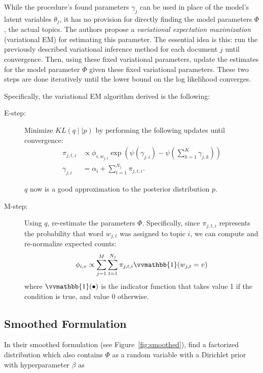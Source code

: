 \documentclass[11pt]{article}
\newcommand{\indicator}{\vvmathbb{1}}
\begin{document}
While the procedure's found parameters $\gamma_j$ can be used in place of
the model's latent variables $\theta_j$, it has no provision for directly
finding the model parameters $\Phi$, the actual topics. The authors propose
a \emph{variational expectation maximization} (variational EM) for
estimating this parameter. The essential idea is this: run the previously
described variational inference method for each document $j$ until
convergence. Then, using these fixed variational parameters, update the
estimates for the model parameter $\Phi$ given these fixed variational
parameters. These two steps are done iteratively until the lower bound on
the log likelihood converges.

Specifically, the variational EM algorithm derived is the following:
\begin{description}
  \item[E-step:]
    Minimize $KL(q \mid\mid p)$ by performing the following updates until
    convergence:
    \begin{align*}
      \pi_{j,t,i} &\propto
      \phi_{i,w_{j,t}} \exp \left(
        \psi(\gamma_{j,i}) - \psi\left(\sum_{k=1}^K \gamma_{j,k}\right)
      \right)\\
      \gamma_{j,i} &= \alpha_i + \sum_{t=1}^{N_j} \pi_{j,t,i}.
    \end{align*}

    $q$ now is a good approximation to the posterior distribution $p$.
  \item[M-step:] Using $q$, re-estimate the parameters $\Phi$.
    Specifically, since $\pi_{j,t,i}$ represents the probability that word
    $w_{j,t}$ was assigned to topic $i$, we can compute and re-normalize
    expected counts:
    \begin{equation}
        \phi_{i,v} \propto \sum_{j=1}^M
        \sum_{t=1}^{N_j} \pi_{j,t,i} \indicator(w_{j,t} = v)
        \label{eqn:varemphi}
    \end{equation}
    where $\indicator(\bullet)$ is the indicator function that takes value
    1 if the condition is true, and value 0 otherwise.
\end{description}

\subsection{Smoothed Formulation}

In their smoothed formulation (see Figure~\ref{fig:smoothed}),
\citet{Blei:2003:LDA} find a factorized distribution which also contains
$\Phi$ as a random variable with a Dirichlet prior with hyperparameter
$\beta$ as
\end{document}

